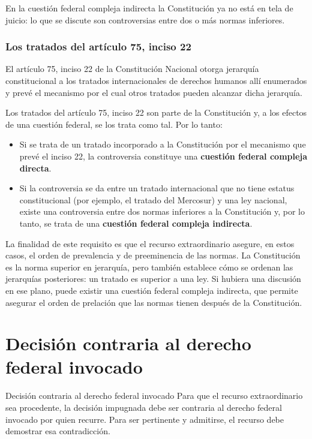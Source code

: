 \documentclass[12pt,oneside]{book}
\begin{document}
En la cuestión federal compleja indirecta la Constitución ya no está en tela de juicio: lo que se discute son controversias entre dos o más normas inferiores.

\subsubsection*{Los tratados del artículo 75, inciso 22}

El artículo 75, inciso 22 de la Constitución Nacional otorga jerarquía constitucional a los tratados internacionales de derechos humanos allí enumerados y prevé el mecanismo por el cual otros tratados pueden alcanzar dicha jerarquía.

Los tratados del artículo 75, inciso 22 son parte de la Constitución y, a los efectos de una cuestión federal, se los trata como tal. Por lo tanto:

\begin{itemize}
    \item Si se trata de un tratado incorporado a la Constitución por el mecanismo que prevé el inciso 22, la controversia constituye una \textbf{cuestión federal compleja directa}.
    \item Si la controversia se da entre un tratado internacional que no tiene estatus constitucional (por ejemplo, el tratado del Mercosur) y una ley nacional, existe una controversia entre dos normas inferiores a la Constitución y, por lo tanto, se trata de una \textbf{cuestión federal compleja indirecta}.
\end{itemize}

La finalidad de este requisito es que el recurso extraordinario asegure, en estos casos, el orden de prevalencia y de preeminencia de las normas. La Constitución es la norma superior en jerarquía, pero también establece cómo se ordenan las jerarquías posteriores: un tratado es superior a una ley. Si hubiera una discusión en ese plano, puede existir una cuestión federal compleja indirecta, que permite asegurar el orden de prelación que las normas tienen después de la Constitución.

\section{Decisión contraria al derecho federal invocado}

\begin{definition}{Decisión contraria al derecho federal invocado}
Para que el recurso extraordinario sea procedente, la decisión impugnada debe ser contraria al derecho federal invocado por quien recurre. Para ser pertinente y admitirse, el recurso debe demostrar esa contradicción.
\end{definition}
\end{document}
